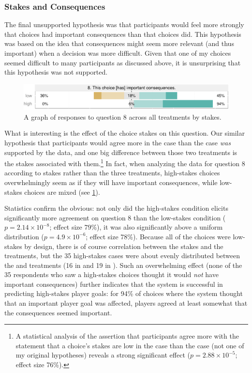 \subsubsection{Stakes and Consequences}

The final unsupported hypothesis was that participants would feel more strongly that \dlm{} choices had important consequences than that \obv{} choices did.
%
This hypothesis was based on the idea that consequences might seem more relevant (and thus important) when a decision was more difficult.
%
Given that one of my \obv{} choices seemed difficult to many participants as discussed above, it is unsurprising that this hypothesis was not supported.


\begin{figure}[!h]
  \includegraphics[width=\textwidth]{fig/stakes-q8.pdf}
  \caption[Prospective consequences results by stakes]{A graph of responses to question 8 across all treatments by stakes.}
  \label{fig:e1-stakesq8}
\end{figure}


What is interesting is the effect of the choice stakes on this question.
%
Our similar hypothesis that participants would agree more in the \dlm{} case than the \rlx{} case \emph{was} supported by the data, and one big difference between those two treatments is the stakes associated with them.\footnote{A statistical analysis of the assertion that participants agree more with the statement that a choice's stakes are low in the \rlx{} case than the \dlm{} case (not one of my original hypotheses) reveals a strong significant effect ($p = 2.88\times10^{-5}$; effect size 76\%).}
%
In fact, when analyzing the data for question 8 according to stakes rather than the three treatments, high-stakes choices overwhelmingly seem as if they will have important consequences, while low-stakes choices are mixed (see \cref{fig:e1-stakesq8}).


Statistics confirm the obvious: not only did the high-stakes condition elicits significantly more agreement on question 8 than the low-stakes condition ($p = 2.14\times10^{-8}$; effect size 79\%), it was also significantly above a uniform distribution ($p = 4.9\times10^{-6}$; effect size 78\%).
%
Because all of the \rlx{} choices were low-stakes by design, there is of course correlation between the stakes and the treatments, but the 35 high-stakes cases were about evenly distributed between the \obv{} and \dlm{} treatments (16 in \obv{} and 19 in \dlm{}).
%
Such an overwhelming effect (none of the 35 respondents who saw a high-stakes choices thought it would \emph{not} have important consequences) further indicates that the system is successful in predicting high-stakes player goals: for 94\% of choices where the system thought that an important player goal was affected, players agreed at least somewhat that the consequences seemed important.


